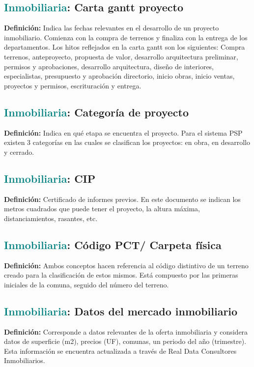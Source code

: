 \documentclass[12pt]{article}
\begin{document}
\subsection{\textcolor{teal}{Inmobiliaria}: Carta gantt proyecto}
\textbf{Definición:} Indica las fechas relevantes en el desarrollo de un proyecto inmobiliario. Comienza con la compra de terrenos y finaliza con la entrega de los departamentos. Los hitos reflejados en la carta gantt son los siguientes: Compra terrenos, anteproyecto, propuesta de valor, desarrollo arquitectura preliminar, permisos y aprobaciones, desarrollo arquitectura, diseño de interiores, especialistas, presupuesto y aprobación directorio, inicio obras, inicio ventas, proyectos y permisos, escrituración y entrega. 
\subsection{\textcolor{teal}{Inmobiliaria}: Categoría de proyecto}
\textbf{Definición:} Indica en qué etapa se encuentra el proyecto. Para el sistema PSP existen 3 categorías en las cuales se clasifican los proyectos: en obra, en desarrollo y cerrado.
\subsection{\textcolor{teal}{Inmobiliaria}: CIP}
\textbf{Definición:} Certificado de informes previos. En este documento se indican los metros cuadrados que puede tener el proyecto, la altura máxima, distanciamientos, rasantes, etc.
\subsection{\textcolor{teal}{Inmobiliaria}: Código PCT/ Carpeta física}
\textbf{Definición:} Ambos conceptos hacen referencia al código distintivo de un terreno creado para la clasificación de estos mismos. Está compuesto por las primeras iniciales de la comuna, seguido del número del terreno.
\subsection{\textcolor{teal}{Inmobiliaria}: Datos del mercado inmobiliario}
\textbf{Definición:} Corresponde a datos relevantes de la oferta inmobiliaria y considera datos de superficie (m2), precios (UF), comunas, un periodo del año (trimestre). Esta información se encuentra actualizada a través de Real Data Consultores Inmobiliarios.
\end{document}
